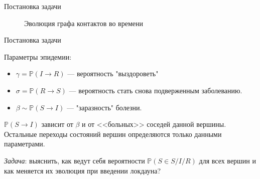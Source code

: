 	\begin{frame}{Постановка задачи}
		
			\begin{figure}[t]
				\caption{Эволюция графа контактов во времени}
			\end{figure}
		
	\end{frame}

	\begin{frame}{Постановка задачи}
		
	Параметры эпидемии:
		
	\begin{itemize}
		\item $\gamma = \mathbb{P}(I \rightarrow R)$ --- вероятность "выздороветь"
		\item $\sigma = \mathbb{P}(R \rightarrow S)$ --- вероятность стать снова подверженным заболеванию.
		\item $\beta \sim \mathbb{P}(S \rightarrow I)$ --- "заразность" болезни.
	\end{itemize}
	
	$\mathbb{P}(S \rightarrow I)$ зависит от $\beta$ и от <<больных>> соседей данной вершины. Остальные переходы состояний вершин определяются только данными параметрами.  \medskip
	
	\textit{Задача}: выяснить, как ведут себя вероятности $ \mathbb{P}(S \in S / I / R) $ для всех вершин и как меняется их эволюция при введении локдауна?
		
	\end{frame}

